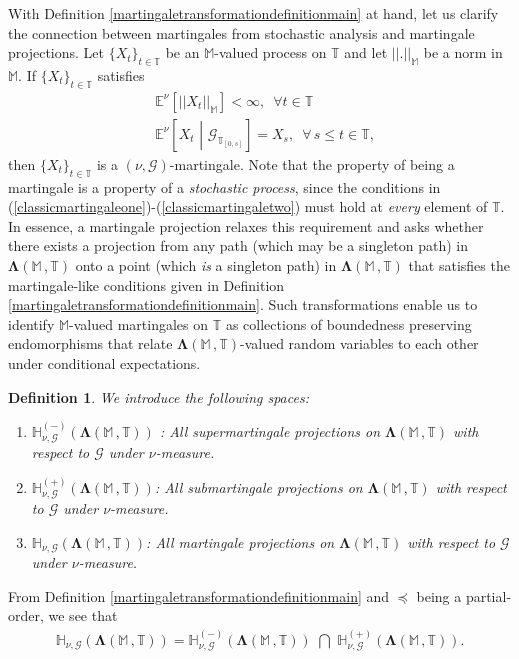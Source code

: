 \documentclass[12pt,a4paper]{article}
\newtheorem{defn}[thm]{Definition}
\def\M{\mathbb{M}}
\def\T{\mathbb{T}}
\def\G{\mathscr{G}}
\begin{document}
With Definition \ref{martingaletransformationdefinitionmain} at hand, let us clarify the connection between martingales from stochastic analysis \cite{Williams 1991, Karatzas Shreve 1991, Rogers Williams 2000} and martingale projections. Let $\{X_t\}_{t\in\T}$ be an $\mathbb M$-valued process on $\T$ and let $|| . ||_{\mathbb M}$ be a norm in $\mathbb M$. If $\{X_t\}_{t\in\T}$ satisfies
\begin{align}
&\mathbb{E}^{\nu}\left[ || X_t ||_{\mathbb M} \right] < \infty, \,\,\, \text{$\forall t \in \T$} \label{classicmartingaleone} \\
&\mathbb{E}^{\nu}\left[ X_t \,\, \left| \,\, \G_{\T_{[0,s]}} \right.\right] = X_{s}, \,\,\, \text{$\forall \, s \leq t \in \T$}, \label{classicmartingaletwo}
\end{align}
then $\{X_t\}_{t\in\T}$ is a $(\nu,\G)$-martingale. Note that the property of being a martingale is a property of a \emph{stochastic process}, since the conditions in (\ref{classicmartingaleone})-(\ref{classicmartingaletwo}) must hold at \emph{every} element of $\T$. In essence, a martingale projection relaxes this requirement and asks whether there exists a projection from any path (which may be a singleton path) in $\boldsymbol{\Lambda}(\mathbb M \,, \T)$ onto a point (which \emph{is} a singleton path) in $\boldsymbol{\Lambda}(\mathbb M \,, \T)$ that satisfies the martingale-like conditions given in Definition \ref{martingaletransformationdefinitionmain}. Such transformations enable us to identify $\mathbb M$-valued martingales on $\T$ as collections of boundedness preserving endomorphisms that relate $\boldsymbol{\Lambda}(\mathbb M \,, \T)$-valued random variables to each other under conditional expectations. 
%
\begin{defn} {\em 
We introduce  the following spaces:
\begin{enumerate}
\item $\mathbb{H}^{(-)}_{\nu,\G}(\boldsymbol{\Lambda}(\M \,, \T))$ : All supermartingale projections on $\boldsymbol{\Lambda}(\M \,, \T)$ with respect to $\G$ under $\nu$-measure.
\item $\mathbb{H}^{(+)}_{\nu,\G}(\boldsymbol{\Lambda}(\M \,, \T))$: All submartingale projections on $\boldsymbol{\Lambda}(\M \,, \T)$ with respect to $\G$ under $\nu$-measure.
\item $\mathbb{H}_{\nu,\G}(\boldsymbol{\Lambda}(\M \,, \T))$: All martingale projections on $\boldsymbol{\Lambda}(\M \,, \T)$ with respect to $\G$ under $\nu$-measure.
\end{enumerate}
}
\end{defn}
%
\noindent From Definition \ref{martingaletransformationdefinitionmain} and $\preceq$ being a partial-order, we see that
\begin{align}
\mathbb{H}_{\nu,\G}(\boldsymbol{\Lambda}(\mathbb M \,, \T)) = \mathbb{H}^{(-)}_{\nu,\G}(\boldsymbol{\Lambda}(\mathbb M \,, \T)) \,\, \bigcap \,\, \mathbb{H}^{(+)}_{\nu,\G}(\boldsymbol{\Lambda}(\mathbb M \,, \T)). 
\end{align}
\end{document}
